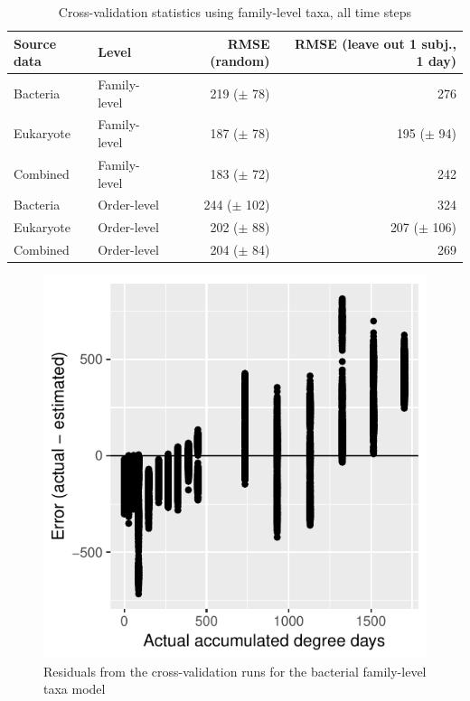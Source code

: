 \documentclass{article}
\begin{document}
\begin{table}
  \centering
\caption{\label{tbl:valid_model_stats_all_days}Cross-validation statistics using family-level taxa, all time steps}
\begin{tabular}{llrr}
Source data & Level & RMSE (random) & RMSE (leave out 1 subj., 1 day)\\ \hline
Bacteria  & Family-level & 219 ($\pm$ 78) & 276\\
Eukaryote & Family-level & 187 ($\pm$ 78) & 195 ($\pm$ 94)\\
Combined  & Family-level & 183 ($\pm$ 72) & 242\\ \hline
Bacteria  & Order-level & 244 ($\pm$ 102) & 324\\
Eukaryote & Order-level & 202 ($\pm$ 88) & 207 ($\pm$ 106)\\
Combined  & Order-level & 204 ($\pm$ 84)   & 269
\end{tabular}
\end{table}


\begin{figure}
  \centering
  \includegraphics{../revise_algorithm/only_families/all_time_steps/hit_1perc_twice/orig_units_all_data_families_residuals}
  \caption{Residuals from the cross-validation runs for the bacterial
    family-level taxa model}
  \label{fig:resids_cv_bac_family_taxa}
\end{figure}
\end{document}
